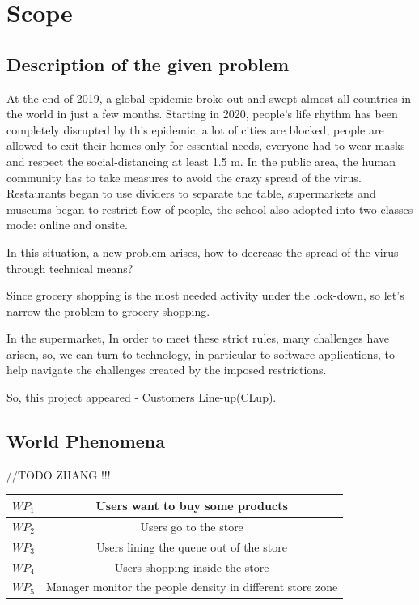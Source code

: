 \documentclass[a4paper,12pt]{report}
\begin{document}
\section{Scope}
\subsection{Description of the given problem}

At the end of 2019, a global epidemic broke out and swept almost all countries in the world in just a few months. Starting in 2020, people's life rhythm has been completely disrupted by this epidemic, a lot of cities are blocked, people are allowed to exit their homes only for essential needs, everyone had to wear masks and respect the social-distancing at least 1.5 m. In the public area, the human community has to take measures to avoid the crazy spread of the virus. Restaurants began to use dividers to separate the table, supermarkets and museums began to restrict flow of people, the school also adopted into two classes mode: online and onsite.

In this situation, a new problem arises, how to decrease the spread of the virus through technical means? 

Since grocery shopping is the most needed activity under the lock-down, so let’s narrow the problem to grocery shopping.

In the supermarket, In order to meet these strict rules, many challenges have arisen, so, we can turn to technology, in particular to software applications, to help navigate the challenges created by the imposed restrictions.

So, this project appeared - Customers Line-up(CLup).

\subsection{World Phenomena}

//TODO ZHANG !!!
\begin{center}
	\begin{tabular}{ c|c } 
		\hline
		$WP_1$ & Users want to buy some products \\ 
		\hline
		$WP_2$ & Users go to the store \\ 
		\hline
		$WP_3$ & Users lining the queue out of the store \\ 
		\hline
		$WP_4$ & Users shopping inside the store \\ 
		\hline
		$WP_5$ & Manager monitor the people density in different store zone \\ 
		\hline
	\end{tabular}
\end{center}
\end{document}
